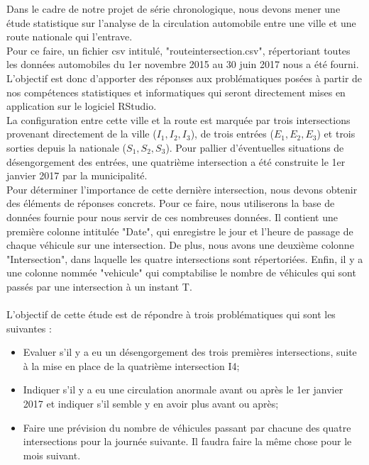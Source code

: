 \documentclass[titlepage]{article}
\begin{document}
Dans le cadre de notre projet de série chronologique, nous devons mener une étude statistique sur l'analyse de la circulation automobile entre une ville et une route nationale qui l'entrave.
\\
Pour ce faire, un fichier csv intitulé, "routeintersection.csv", répertoriant toutes les données automobiles du 1er novembre 2015 au 30 juin 2017 nous a été fourni. 
\\
L'objectif est donc d'apporter des réponses aux problématiques posées à  partir de nos compétences statistiques et informatiques qui seront directement mises en application sur le logiciel RStudio.
\vspace{0.5cm}
\\
La configuration entre cette ville et la route est marquée par trois intersections provenant directement de la ville ($I_1, I_2, I_3$), de trois entrées ($E_1, E_2, E_3$) et trois sorties depuis la nationale ($S_1, S_2, S_3$). Pour pallier d'éventuelles situations de désengorgement des entrées, une quatrième intersection a été construite le 1er janvier 2017 par la municipalité. 
\\
Pour déterminer l'importance de cette dernière intersection, nous devons obtenir des éléments de réponses concrets. Pour ce faire, nous utiliserons la base de données fournie pour nous servir de ces nombreuses données. 
Il contient une première colonne intitulée "Date", qui  enregistre le jour et l'heure de passage de chaque véhicule sur une intersection. 
De plus, nous avons une deuxième colonne "Intersection", dans laquelle les quatre intersections sont répertoriées. 
Enfin, il y a une colonne nommée "vehicule" qui comptabilise le nombre de véhicules qui sont passés par une intersection à  un instant T.
\\
\vspace{0.5cm}
\\
L'objectif de cette étude est de répondre à trois problématiques qui sont les suivantes : 

\begin{itemize}
    \item Evaluer s'il y a eu un désengorgement des trois premières intersections, suite à la mise en place de la quatrième intersection I4;
    \item Indiquer s'il y a eu une circulation anormale avant ou après le 1er janvier 2017 et indiquer s'il semble y en avoir plus avant ou après;
    \item Faire une prévision du nombre de véhicules passant par chacune des quatre intersections pour la journée suivante. Il faudra faire la même chose pour le mois suivant.
\end{itemize}
\vspace{0.5cm}
\end{document}
